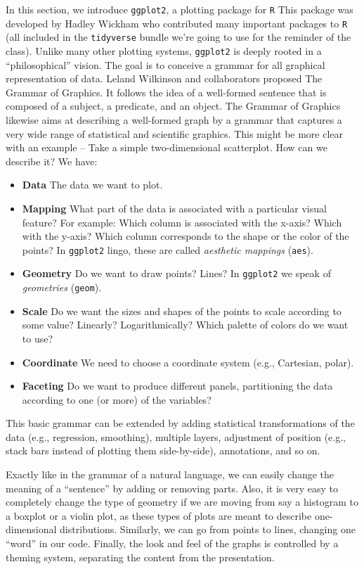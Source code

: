\documentclass[
  letterpaper,
  DIV=11,
  numbers=noendperiod]{scrreprt}
\begin{document}
In this section, we introduce \texttt{ggplot2}, a plotting package for
\texttt{R} This package was developed by Hadley Wickham who contributed
many important packages to \texttt{R} (all included in the
\texttt{tidyverse} bundle we're going to use for the reminder of the
class). Unlike many other plotting systems, \texttt{ggplot2} is deeply
rooted in a ``philosophical'' vision. The goal is to conceive a grammar
for all graphical representation of data. Leland Wilkinson and
collaborators proposed The Grammar of Graphics. It follows the idea of a
well-formed sentence that is composed of a subject, a predicate, and an
object. The Grammar of Graphics likewise aims at describing a
well-formed graph by a grammar that captures a very wide range of
statistical and scientific graphics. This might be more clear with an
example -- Take a simple two-dimensional scatterplot. How can we
describe it? We have:

\begin{itemize}
\item
  \textbf{Data} The data we want to plot.
\item
  \textbf{Mapping} What part of the data is associated with a particular
  visual feature? For example: Which column is associated with the
  x-axis? Which with the y-axis? Which column corresponds to the shape
  or the color of the points? In \texttt{ggplot2} lingo, these are
  called \emph{aesthetic mappings} (\texttt{aes}).
\item
  \textbf{Geometry} Do we want to draw points? Lines? In
  \texttt{ggplot2} we speak of \emph{geometries} (\texttt{geom}).
\item
  \textbf{Scale} Do we want the sizes and shapes of the points to scale
  according to some value? Linearly? Logarithmically? Which palette of
  colors do we want to use?
\item
  \textbf{Coordinate} We need to choose a coordinate system (e.g.,
  Cartesian, polar).
\item
  \textbf{Faceting} Do we want to produce different panels, partitioning
  the data according to one (or more) of the variables?
\end{itemize}

This basic grammar can be extended by adding statistical transformations
of the data (e.g., regression, smoothing), multiple layers, adjustment
of position (e.g., stack bars instead of plotting them side-by-side),
annotations, and so on.

Exactly like in the grammar of a natural language, we can easily change
the meaning of a ``sentence'' by adding or removing parts. Also, it is
very easy to completely change the type of geometry if we are moving
from say a histogram to a boxplot or a violin plot, as these types of
plots are meant to describe one-dimensional distributions. Similarly, we
can go from points to lines, changing one ``word'' in our code. Finally,
the look and feel of the graphs is controlled by a theming system,
separating the content from the presentation.
\end{document}
